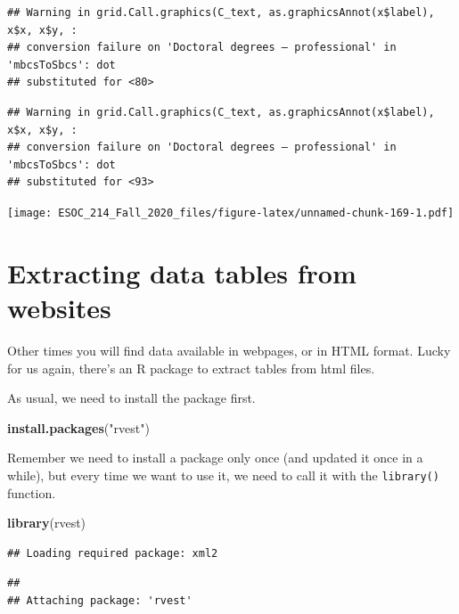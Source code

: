 \documentclass[
]{book}
\newenvironment{Shaded}{\begin{snugshade}}{\end{snugshade}}
\newcommand{\KeywordTok}[1]{\textcolor[rgb]{0.13,0.29,0.53}{\textbf{#1}}}
\newcommand{\NormalTok}[1]{#1}
\newcommand{\StringTok}[1]{\textcolor[rgb]{0.31,0.60,0.02}{#1}}
\begin{document}
\begin{verbatim}
## Warning in grid.Call.graphics(C_text, as.graphicsAnnot(x$label), x$x, x$y, :
## conversion failure on 'Doctoral degrees – professional' in 'mbcsToSbcs': dot
## substituted for <80>
\end{verbatim}

\begin{verbatim}
## Warning in grid.Call.graphics(C_text, as.graphicsAnnot(x$label), x$x, x$y, :
## conversion failure on 'Doctoral degrees – professional' in 'mbcsToSbcs': dot
## substituted for <93>
\end{verbatim}

\texttt{[image: ESOC\_214\_Fall\_2020\_files/figure-latex/unnamed-chunk-169-1.pdf]}

\hypertarget{extracting-data-tables-from-websites}{%
\section{Extracting data tables from websites}\label{extracting-data-tables-from-websites}}

Other times you will find data available in webpages, or in HTML format. Lucky for us again, there's an R package to extract tables from html files.

As usual, we need to install the package first.

\begin{Shaded}
\begin{Highlighting}[]
\KeywordTok{install.packages}\NormalTok{(}\StringTok{"rvest"}\NormalTok{)}
\end{Highlighting}
\end{Shaded}

Remember we need to install a package only once (and updated it once in a while), but every time we want to use it, we need to call it with the \texttt{library()} function.

\begin{Shaded}
\begin{Highlighting}[]
\KeywordTok{library}\NormalTok{(rvest)}
\end{Highlighting}
\end{Shaded}

\begin{verbatim}
## Loading required package: xml2
\end{verbatim}

\begin{verbatim}
## 
## Attaching package: 'rvest'
\end{verbatim}
\end{document}
